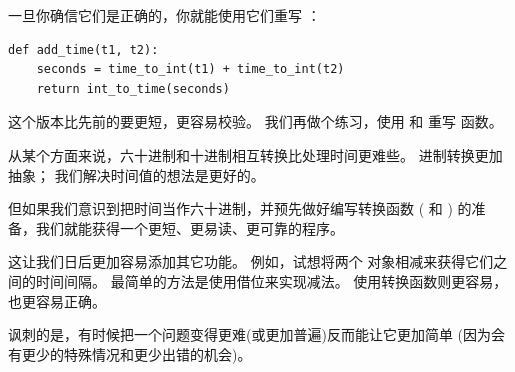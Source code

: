 {一旦你确信它们是正确的，你就能使用它们重写  ：

\begin{lstlisting}
def add_time(t1, t2):
    seconds = time_to_int(t1) + time_to_int(t2)
    return int_to_time(seconds)
\end{lstlisting}

%

这个版本比先前的要更短，更容易校验。
我们再做个练习，使用  和 
重写  函数。


从某个方面来说，六十进制和十进制相互转换比处理时间更难些。 进制转换更加抽象；
我们解决时间值的想法是更好的。


但如果我们意识到把时间当作六十进制，并预先做好编写转换函数 (
和 ) 的准备，我们就能获得一个更短、更易读、更可靠的程序。


这让我们日后更加容易添加其它功能。 例如，试想将两个 
对象相减来获得它们之间的时间间隔。
最简单的方法是使用借位来实现减法。 使用转换函数则更容易，也更容易正确。

  


讽刺的是，有时候把一个问题变得更难(或更加普遍)反而能让它更加简单
(因为会有更少的特殊情况和更少出错的机会)。

}
